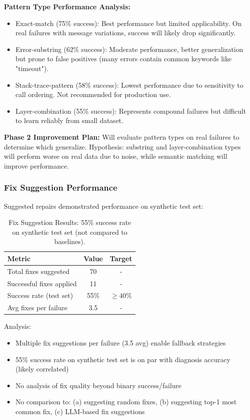 \documentclass[11pt]{article}
\begin{document}
\textbf{Pattern Type Performance Analysis:}
\begin{itemize}
    \item Exact-match (75\% success): Best performance but limited applicability. On real failures with message variations, success will likely drop significantly.
    \item Error-substring (62\% success): Moderate performance, better generalization but prone to false positives (many errors contain common keywords like "timeout").
    \item Stack-trace-pattern (58\% success): Lowest performance due to sensitivity to call ordering. Not recommended for production use.
    \item Layer-combination (55\% success): Represents compound failures but difficult to learn reliably from small dataset.
\end{itemize}

\textbf{Phase 2 Improvement Plan:} Will evaluate pattern types on real failures to determine which generalize. Hypothesis: substring and layer-combination types will perform worse on real data due to noise, while semantic matching will improve performance.

\subsubsection{Fix Suggestion Performance}

Suggested repairs demonstrated performance on synthetic test set:

\begin{table}[h!]
\centering
\begin{tabular}{lcc}
\toprule
\textbf{Metric} & \textbf{Value} & \textbf{Target} \\
\midrule
Total fixes suggested & 70 & - \\
Successful fixes applied & 11 & - \\
Success rate (test set) & 55\% & $\geq 40\%$ \\
Avg fixes per failure & 3.5 & - \\
\bottomrule
\end{tabular}
\caption{Fix Suggestion Results: 55\% success rate on synthetic test set (not compared to baselines).}
\label{tab:fix_results}
\end{table}

Analysis:
\begin{itemize}
    \item Multiple fix suggestions per failure (3.5 avg) enable fallback strategies
    \item 55\% success rate on synthetic test set is on par with diagnosis accuracy (likely correlated)
    \item No analysis of fix quality beyond binary success/failure
    \item No comparison to: (a) suggesting random fixes, (b) suggesting top-1 most common fix, (c) LLM-based fix suggestions
\end{itemize}
\end{document}
